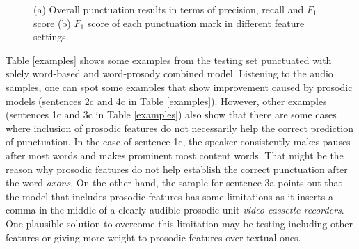 \begin{figure}
\begin{minipage}{.8\linewidth}
\centering
{}
\end{minipage}%
\par\medskip
\centering
{}
\caption{(a) Overall punctuation results in terms of precision, recall and $F_1$ score (b) $F_1$ score of each punctuation mark in different feature settings.}
\label{fig:main}
\end{figure}

Table \ref{examples} shows some examples from the testing set punctuated with solely word-based and word-prosody combined model. Listening to the audio samples, one can spot some examples that show improvement caused by prosodic models (sentences 2c and 4c in Table \ref{examples}). 
However, other examples (sentences 1c and 3c in Table \ref{examples}) also show that there are some cases where inclusion of prosodic features do not necessarily help the correct prediction of punctuation. In the case of sentence 1c, the speaker consistently makes pauses after most words and makes prominent most content words. That might be the reason why prosodic features do not help establish the correct punctuation after the word {\it axons}. On the other hand, the sample for sentence 3a points out that the model that includes prosodic features has some limitations as it inserts a comma in the middle of a clearly audible prosodic unit {\it video cassette recorders}. One plausible solution to overcome this limitation may be testing including other features or giving more weight to prosodic features over textual ones.

